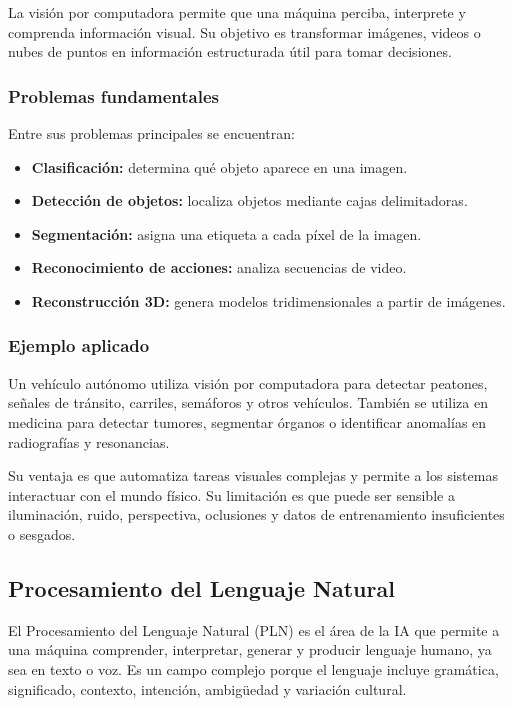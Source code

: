 La visión por computadora permite que una máquina perciba, interprete y comprenda información visual. Su objetivo es transformar imágenes, videos o nubes de puntos en información estructurada útil para tomar decisiones.

\subsubsection{Problemas fundamentales}

Entre sus problemas principales se encuentran:

\begin{itemize}
    \item \textbf{Clasificación:} determina qué objeto aparece en una imagen.
    \item \textbf{Detección de objetos:} localiza objetos mediante cajas delimitadoras.
    \item \textbf{Segmentación:} asigna una etiqueta a cada píxel de la imagen.
    \item \textbf{Reconocimiento de acciones:} analiza secuencias de video.
    \item \textbf{Reconstrucción 3D:} genera modelos tridimensionales a partir de imágenes.
\end{itemize}

\subsubsection{Ejemplo aplicado}

Un vehículo autónomo utiliza visión por computadora para detectar peatones, señales de tránsito, carriles, semáforos y otros vehículos. También se utiliza en medicina para detectar tumores, segmentar órganos o identificar anomalías en radiografías y resonancias.

Su ventaja es que automatiza tareas visuales complejas y permite a los sistemas interactuar con el mundo físico. Su limitación es que puede ser sensible a iluminación, ruido, perspectiva, oclusiones y datos de entrenamiento insuficientes o sesgados.

\subsection{Procesamiento del Lenguaje Natural}

El Procesamiento del Lenguaje Natural (PLN) es el área de la IA que permite a una máquina comprender, interpretar, generar y producir lenguaje humano, ya sea en texto o voz. Es un campo complejo porque el lenguaje incluye gramática, significado, contexto, intención, ambigüedad y variación cultural.

